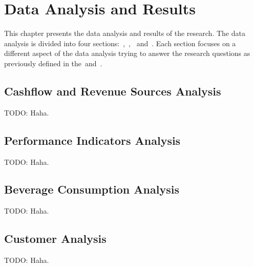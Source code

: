 \chapter{Data Analysis and Results}
\label{ch:data-analysis-and-results}

This chapter presents the data analysis and results of the research.
The data analysis is divided into four sections:~,~,~ and~.
Each section focuses on a different aspect of the data analysis trying to answer the research questions as previously defined in the~and~.


\section{Cashflow and Revenue Sources Analysis}
\label{sec:analysis-cashflow-and-revenue-sources}
TODO: Haha.


\section{Performance Indicators Analysis}
\label{sec:analysis-performance-indicators}
TODO: Haha.


\section{Beverage Consumption Analysis}
\label{sec:analysis-beverage-consumption}
TODO: Haha.


\section{Customer Analysis}
\label{sec:analysis-customers}
TODO: Haha.

